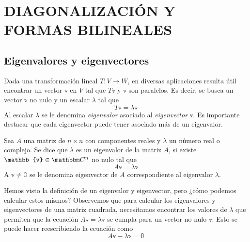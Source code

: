 \chapter{DIAGONALIZACIÓN Y FORMAS BILINEALES}\label{chapter:bilineal}
\printchaptertableofcontents

\section{Eigenvalores y eigenvectores}

Dada una transformación lineal $T: V \longrightarrow W$, en diversas aplicaciones  resulta útil encontrar un vector $\mathbb{v}$ en $V$ tal que $T\mathbb{v}$ y $\mathbb{v}$ son paralelos. Es decir, se busca un vector $\mathbb{v}$ no nulo y un escalar $\lambda$ tal que
$$T\mathbb{v} = \lambda \mathbb{v}$$
Al escalar $\lambda$ se le denomina \emph{eigenvalor} asociado al \emph{eigenvector} $\mathbb{v}$. Es importante destacar que cada eigenvector puede tener asociado más de un eigenvalor.

\begin{definition}\label{def:eigenvalor}
    Sea $A$ una matriz de $n \times n$ con componentes reales y $\lambda$ un número real o complejo. Se dice que $\lambda$ es un eigenvalor de la matriz $A$, si existe $\mathbb{v} \in \CC[n]$ no nulo tal que
    $$A\mathbb{v} = \lambda \mathbb{v}$$
    A $\mathbb{v} \neq \mathbb{0}$ se le denomina eigenvector de $A$ correspondiente al eigenvalor $\lambda$.
\end{definition}

Hemos visto la definición de un eigenvalor y eigenvector, pero ¿cómo podemos calcular estos mismos? Observemos que para calcular los eigenvalores y eigenvectores de una matriz cuadrada, necesitamos encontrar los valores de $\lambda$ que permiten que la ecuación $A \mathbb{v} = \lambda \mathbb{v}$ se cumpla para un vector no nulo $\mathbb{v}$. Esto se puede hacer reescribiendo la ecuación como
$$A \mathbb{v} - \lambda \mathbb{v} = \mathbb{0}$$


